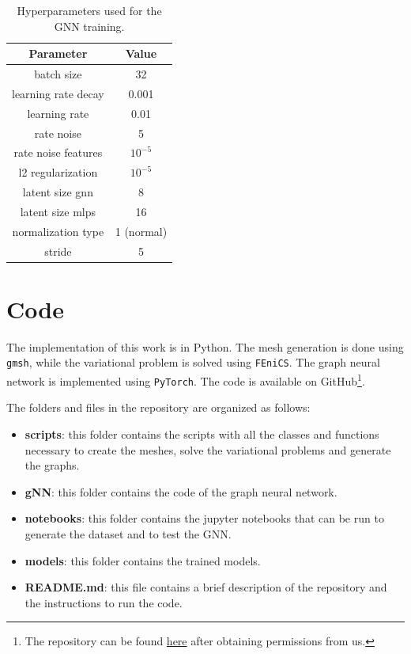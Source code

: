 \documentclass[11pt,a4paper]{article}
\begin{document}
\begin{table}[H]
    \centering
    \begin{tabular}{|c|c|}
        \hline
        \textbf{Parameter} & \textbf{Value} \\
        \hline
        batch size & 32 \\
        learning rate decay & 0.001 \\
        learning rate & 0.01 \\
        rate noise & 5 \\
        rate noise features & \(10^{-5}\) \\
        l2 regularization & \(10^{-5}\) \\
        latent size gnn & 8 \\
        latent size mlps & 16\\
        normalization type & 1 (normal) \\
        stride & 5 \\
        \hline   
    \end{tabular}
    \caption{Hyperparameters used for the GNN training.}
    \label{hyperparams}
\end{table}


\section{Code}

The implementation of this work is in Python. The mesh generation is done using \texttt{gmsh}, while the variational problem is solved using \texttt{FEniCS}. The graph neural network is implemented using \texttt{PyTorch}. The code is available on GitHub\footnote{The repository can be found \href{https://github.com/itsmebonny/pacsproj}{here} after obtaining permissions from us.}.

\noindent
The folders and files in the repository are organized as follows:
\medskip
\begin{itemize}
    \item[\faFolder] \textbf{scripts}: this folder contains the scripts with all the classes and functions necessary to create the meshes, solve the variational problems and generate the graphs. 
    \medskip
    \item[\faFolder] \textbf{gNN}: this folder contains the code of the graph neural network.
    \medskip
    \item[\faFolder] \textbf{notebooks}: this folder contains the jupyter notebooks that can be run to generate the dataset and to test the GNN.
    \medskip
    \item[\faFolder] \textbf{models}: this folder contains the trained models.
    \medskip
    \item[\faFileO] \textbf{README.md}: this file contains a brief description of the repository and the instructions to run the code.
\end{itemize}
\end{document}
